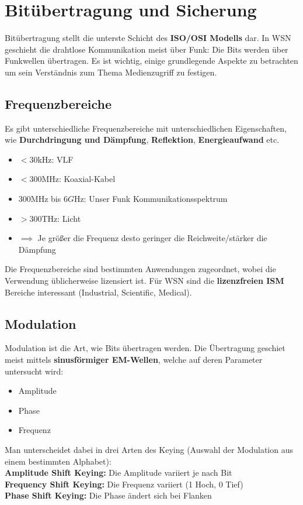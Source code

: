 \documentclass[a4paper]{article}
\begin{document}
\section{Bitübertragung und Sicherung}
Bitübertragung stellt die unterste Schicht des \textbf{ISO/OSI Modells} dar. In WSN geschieht die drahtlose Kommunikation meist über Funk: Die Bits werden über Funkwellen übertragen. Es ist wichtig, einige grundlegende Aspekte zu betrachten um sein Verständnis zum Thema Medienzugriff zu festigen.\\
\subsection{Frequenzbereiche}
Es gibt unterschiedliche Frequenzbereiche mit unterschiedlichen Eigenschaften, wie \textbf{Durchdringung und Dämpfung}, \textbf{Reflektion}, \textbf{Energieaufwand} etc.\\
\begin{itemize}
	\item $<30$kHz: VLF
	\item $<300$MHz: Koaxial-Kabel
	\item $300$MHz bis $6G$Hz: Unser Funk Kommunikationsspektrum
	\item $>300$THz: Licht
	\item$\implies$ Je größer die Frequenz desto geringer die Reichweite/stärker die Dämpfung
\end{itemize}
Die Frequenzbereiche sind bestimmten Anwendungen zugeordnet, wobei die Verwendung üblicherweise lizensiert ist. Für WSN sind die \textbf{lizenzfreien ISM} Bereiche interessant (Industrial, Scientific,  Medical).
\subsection{Modulation}
Modulation ist die Art, wie Bits übertragen werden. Die Übertragung geschiet meist mittels \textbf{sinusförmiger EM-Wellen}, welche auf deren Parameter untersucht wird:
\begin{itemize}
	\item Amplitude
	\item Phase
	\item Frequenz
\end{itemize}
Man unterscheidet dabei in drei Arten des Keying (Auswahl der Modulation aus einem bestimmten Alphabet):\\

\textbf{Amplitude Shift Keying:} Die Amplitude variiert je nach Bit\\
\textbf{Frequency Shift Keying:} Die Frequenz variiert (1 Hoch, 0 Tief)\\
\textbf{Phase Shift Keying:} Die Phase ändert sich bei Flanken\\
\end{document}
